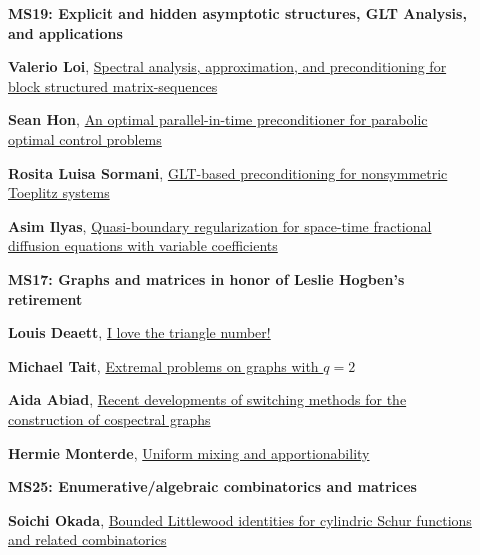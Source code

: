 \documentclass[ILAS2025-program.tex]{subfiles}
\begin{document}
\begin{description}
\begin{description}
        \end{description}
    \begin{description}
    \item[] {\color{mstitle}\textbf{MS19: Explicit and hidden asymptotic structures, GLT Analysis, and applications}} 
    \item[] \hypertarget{up0173}{}\textbf{Valerio Loi}, \hyperlink{down0173}{Spectral analysis, approximation, and preconditioning for block structured matrix-sequences}
        \item[] \hypertarget{up0174}{}\textbf{Sean Hon}, \hyperlink{down0174}{An optimal parallel-in-time preconditioner for parabolic optimal control problems}
        \item[] \hypertarget{up0175}{}\textbf{Rosita Luisa Sormani}, \hyperlink{down0175}{GLT-based preconditioning for nonsymmetric Toeplitz systems}
        \item[] \hypertarget{up0176}{}\textbf{Asim Ilyas}, \hyperlink{down0176}{Quasi-boundary regularization for space-time fractional diffusion equations with variable coefficients}
        \end{description}
    \begin{description}
    \item[] {\color{mstitle}\textbf{MS17: Graphs and matrices in honor of Leslie Hogben's retirement}} 
    \item[] \hypertarget{up0177}{}\textbf{Louis Deaett}, \hyperlink{down0177}{I love the triangle number!}
        \item[] \hypertarget{up0178}{}\textbf{Michael Tait}, \hyperlink{down0178}{Extremal problems on graphs with $q=2$}
        \item[] \hypertarget{up0179}{}\textbf{Aida Abiad}, \hyperlink{down0179}{Recent developments of switching methods for the construction of cospectral graphs}
        \item[] \hypertarget{up0180}{}\textbf{Hermie Monterde}, \hyperlink{down0180}{Uniform mixing and apportionability
}
        \end{description}
    \begin{description}
    \item[] {\color{mstitle}\textbf{MS25: Enumerative/algebraic combinatorics and matrices}} 
    \item[] \hypertarget{up0181}{}\textbf{Soichi Okada}, \hyperlink{down0181}{Bounded Littlewood identities for cylindric Schur functions and related combinatorics}

\end{description}
\end{description}
\end{document}
